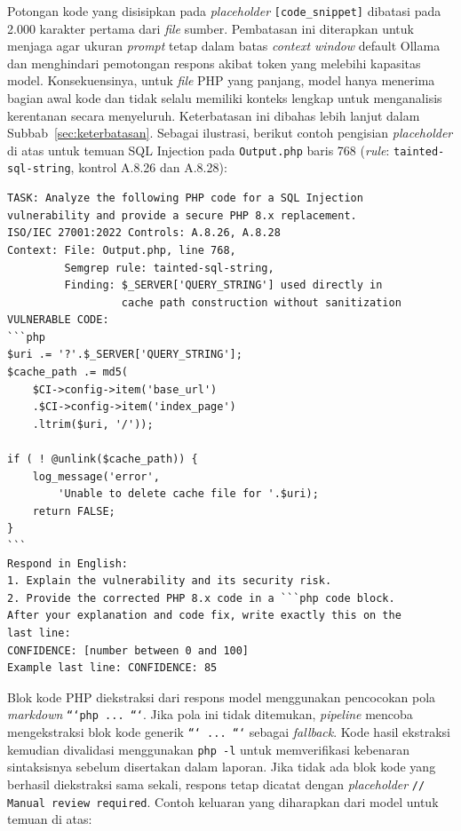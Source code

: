 Potongan kode yang disisipkan pada \textit{placeholder} \texttt{[code\_snippet]} 
dibatasi pada 2.000 karakter pertama dari \textit{file} sumber. Pembatasan ini 
diterapkan untuk menjaga agar ukuran \textit{prompt} tetap dalam batas 
\textit{context window} default Ollama dan menghindari pemotongan respons 
akibat token yang melebihi kapasitas model. Konsekuensinya, untuk \textit{file} 
PHP yang panjang, model hanya menerima bagian awal kode dan tidak selalu 
memiliki konteks lengkap untuk menganalisis kerentanan secara menyeluruh. 
Keterbatasan ini dibahas lebih lanjut dalam Subbab~\ref{sec:keterbatasan}.
Sebagai ilustrasi, berikut contoh pengisian \textit{placeholder} di atas 
untuk temuan SQL Injection pada \texttt{Output.php} baris 768 
(\textit{rule}: \texttt{tainted-sql-string}, kontrol A.8.26 dan A.8.28):
\newpage
\begin{lstlisting}[style=promptstyle]
TASK: Analyze the following PHP code for a SQL Injection
vulnerability and provide a secure PHP 8.x replacement.
ISO/IEC 27001:2022 Controls: A.8.26, A.8.28
Context: File: Output.php, line 768,
         Semgrep rule: tainted-sql-string,
         Finding: $_SERVER['QUERY_STRING'] used directly in
                  cache path construction without sanitization
VULNERABLE CODE:
```php
$uri .= '?'.$_SERVER['QUERY_STRING'];
$cache_path .= md5(
    $CI->config->item('base_url')
    .$CI->config->item('index_page')
    .ltrim($uri, '/'));

if ( ! @unlink($cache_path)) {
    log_message('error',
        'Unable to delete cache file for '.$uri);
    return FALSE;
}
```
Respond in English:
1. Explain the vulnerability and its security risk.
2. Provide the corrected PHP 8.x code in a ```php code block.
After your explanation and code fix, write exactly this on the
last line:
CONFIDENCE: [number between 0 and 100]
Example last line: CONFIDENCE: 85
\end{lstlisting}
Blok kode PHP diekstraksi dari respons model menggunakan pencocokan pola 
\textit{markdown} \texttt{```php ... ```}. Jika pola ini tidak ditemukan, 
\textit{pipeline} mencoba mengekstraksi blok kode generik \texttt{``` ... ```} 
sebagai \textit{fallback}. Kode hasil ekstraksi kemudian divalidasi menggunakan 
\texttt{php -l} untuk memverifikasi kebenaran sintaksisnya sebelum disertakan 
dalam laporan. Jika tidak ada blok kode yang berhasil diekstraksi sama sekali, 
respons tetap dicatat dengan \textit{placeholder} \texttt{// Manual review required}.
\newpage
Contoh keluaran yang diharapkan dari model untuk temuan di atas:

